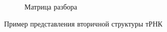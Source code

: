 \documentclass[14pt]{matmex-diploma-custom}
\begin{document}
\begin{figure}[h]
\begin{subfigure}{.3\textwidth}
  \centering
  \caption{Матрица разбора}
  \label{struc_c}
\end{subfigure}
\caption{Пример представления вторичной структуры тРНК}
\label{struc}
\end{figure}
\end{document}
